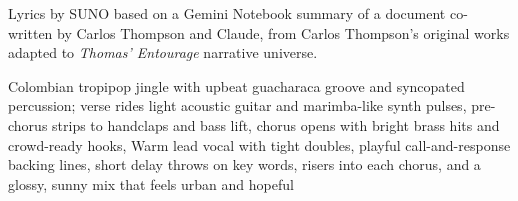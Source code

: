 
\begin{notes}
Lyrics by SUNO based on a Gemini Notebook summary of a document co-written by Carlos Thompson and Claude, from Carlos Thompson's original works adapted to \emph{Thomas’ Entourage} narrative universe.
\end{notes}
\begin{style}
Colombian tropipop jingle with upbeat guacharaca groove and syncopated percussion; verse rides light acoustic guitar and marimba-like synth pulses, pre-chorus strips to handclaps and bass lift, chorus opens with bright brass hits and crowd-ready hooks, Warm lead vocal with tight doubles, playful call-and-response backing lines, short delay throws on key words, risers into each chorus, and a glossy, sunny mix that feels urban and hopeful
\end{style}
